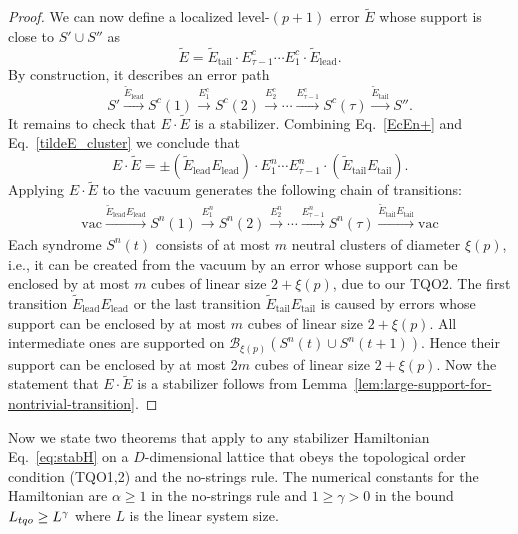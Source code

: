 \begin{proof}
We can now define a localized level-$(p+1)$ error $\tilde{E}$
whose support is close to $S'\cup S''$ as
\begin{equation}
\label{tildeE_cluster}
\tilde{E}=\tilde{E}_\text{tail} \cdot E^c_{\tau-1} \cdots E^c_{1} \cdot \tilde{E}_\text{lead}.
\end{equation}
By construction, it describes an error path
\[
S'\xrightarrow{\tilde{E}_\text{lead}}
S^c(1) \xrightarrow{E^c_1}
S^c(2) \xrightarrow{E^c_2}
\cdots
 \xrightarrow{E^c_{\tau-1}}
S^c(\tau) \xrightarrow{\tilde{E}_\text{tail}}
S''.
\]
It remains to check that $E \cdot \tilde{E}$ is a stabilizer.
Combining Eq.~\eqref{EcEn+} and
Eq.~\eqref{tildeE_cluster} we
conclude that
\[
E\cdot \tilde{E} = \pm (\tilde{E}_\text{lead} E_\text{lead}) \cdot E^n_1 \cdots E^n_{\tau-1} \cdot (\tilde{E}_\text{tail} E_\text{tail}).
\]
Applying  $E\cdot \tilde{E}$ to the vacuum generates the following chain of transitions:
\begin{align}
\label{chain1_cluster}
\mathrm{vac} \xrightarrow{\tilde{E}_\text{lead} E_\text{lead}}
S^n(1) \xrightarrow{E^n_1}
S^n(2) \xrightarrow{E^n_2} \cdots 
 \xrightarrow{E^n_{\tau-1}}
S^n(\tau) \xrightarrow{\tilde{E}_\text{tail} E_\text{tail}}
\mathrm{vac}
\end{align}
Each syndrome $S^n(t)$ consists of at most $m$ neutral clusters of diameter $\xi(p)$, 
i.e., it can be created from the vacuum by an error
whose support can be enclosed by at most $m$ cubes of linear size $2+\xi(p)$,
due to our TQO2.
The first transition $\tilde{E}_\text{lead} E_\text{lead}$
or the last transition $\tilde{E}_\text{tail} E_\text{tail}$
is caused by errors whose support can be enclosed by at most $m$ cubes of linear size $2+\xi(p)$.
All intermediate ones are supported on $\mathcal B_{\xi(p)}(S^n(t)\cup S^n(t+1))$.
Hence their support can be enclosed by at most $2m$ cubes of linear size $2+\xi(p)$.
Now the statement that $E\cdot \tilde{E}$ is a stabilizer follows from Lemma~\ref{lem:large-support-for-nontrivial-transition}.
\end{proof}

Now we state two theorems that apply to any stabilizer Hamiltonian Eq.~\eqref{eq:stabH}
on a $D$-dimensional lattice that obeys the topological order condition (TQO1,2)
and the no-strings rule.
The numerical constants for the Hamiltonian are
$\alpha \ge 1$ in the no-strings rule
and $1 \ge \gamma>0$ in the bound ${L_{tqo}} \ge L^\gamma$
where $L$ is the linear system size.

